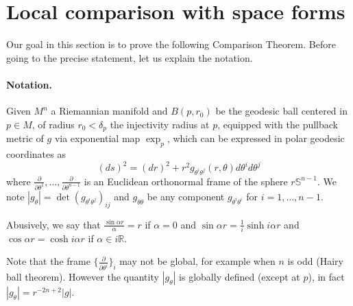 \section{Local comparison with space forms}
\label{sec:orgb09549f}

Our goal in this section is to prove the following Comparison Theorem. Before going to the
precise statement, let us explain the notation.

\paragraph{Notation.}
\label{sec:orge13bced}
Given \(M^n\) a Riemannian manifold and \(B(p,r_0)\) be the geodesic ball centered in
\(p\in M\), of radius \(r_0<\delta_p\) the injectivity radius at \(p\), equipped
with the pullback metric of \(g\) via exponential map \(\exp_p\), which can be expressed in polar geodesic coordinates
as 
\[
(ds)^2 = (dr)^2 + r^2 g_{\theta^i\theta^j}(r,\theta) d\theta^i d\theta^j
\]
where \(\frac{\partial}{\partial\theta^1},\dots,\frac{\partial}{\partial\theta^{n-1}}\)
is an Euclidean orthonormal frame of the sphere
\(r\mathbb{S}^{n-1}\). We note \(|g_\theta| = \det(g_{\theta^i\theta^j})_{ij}\) and
\(g_{\theta\theta}\) be any component \(g_{\theta^i\theta^i}\) for \(i=1,\dots,n-1\).

Abusively, we say that \(\frac{\sin \alpha r}{\alpha} = r\) if \(\alpha = 0\) and \(\sin\alpha r =  \frac{1}{i}\sinh i\alpha r\) and \(\cos \alpha r = \cosh i\alpha r\) if \(\alpha\in i \mathbb{R}\).

\begin{remark}
\label{rem:hairy-ball}
Note that the frame \(\{ \frac{\partial}{\partial\theta^i}\}_i\) may not be global, for
example when \(n\) is odd (Hairy ball theorem). However the quantity \(|g_\theta|\) is
globally defined (except at \(p\)), in fact \(|g_\theta| = r^{-2n+2}|g|\).
\end{remark}


